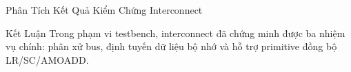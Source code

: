 \begin{frame}{Phân Tích Kết Quả Kiểm Chứng Interconnect}
    \vspace{0.15cm}
    \begin{alertblock}{Kết Luận}
        \scriptsize
        Trong phạm vi testbench, interconnect đã chứng minh được ba nhiệm vụ chính: phân xử bus, định tuyến dữ liệu bộ nhớ và hỗ trợ primitive đồng bộ LR/SC/AMOADD.
    \end{alertblock}
\end{frame}
